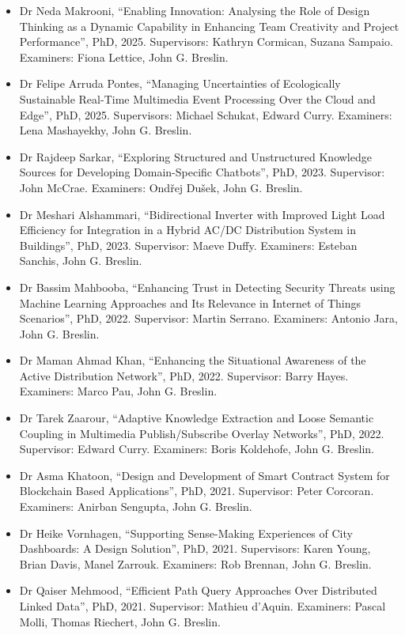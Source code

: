 \documentclass[10pt,a4paper]{res} %
\begin{document}
\begin{resume}
\begin{itemize} \itemsep -2pt
\item Dr Neda Makrooni, ``Enabling Innovation: Analysing the Role of Design Thinking as a Dynamic Capability in Enhancing Team Creativity and Project Performance'', PhD, 2025. Supervisors: Kathryn Cormican, Suzana Sampaio. Examiners: Fiona Lettice, John G. Breslin. %
\item Dr Felipe Arruda Pontes, ``Managing Uncertainties of Ecologically Sustainable Real-Time Multimedia Event Processing Over the Cloud and Edge'', PhD, 2025. Supervisors: Michael Schukat, Edward Curry. Examiners: Lena Mashayekhy, John G. Breslin. %
\item Dr Rajdeep Sarkar, ``Exploring Structured and Unstructured Knowledge Sources for Developing Domain-Specific Chatbots'', PhD, 2023. Supervisor: John McCrae. Examiners: Ond\v{r}ej Du\v{s}ek, John G. Breslin. %
\item Dr Meshari Alshammari, ``Bidirectional Inverter with Improved Light Load Efficiency for Integration in a Hybrid AC/DC Distribution System in Buildings'', PhD, 2023. Supervisor: Maeve Duffy. Examiners: Esteban Sanchis, John G. Breslin. %
\item Dr Bassim Mahbooba, ``Enhancing Trust in Detecting Security Threats using Machine Learning Approaches and Its Relevance in Internet of Things Scenarios'', PhD, 2022. Supervisor: Martin Serrano. Examiners: Antonio Jara, John G. Breslin. %
\item Dr Maman Ahmad Khan, ``Enhancing the Situational Awareness of the Active Distribution Network'', PhD, 2022. Supervisor: Barry Hayes. Examiners: Marco Pau, John G. Breslin. %
\item Dr Tarek Zaarour, ``Adaptive Knowledge Extraction and Loose Semantic Coupling in Multimedia Publish/Subscribe Overlay Networks'', PhD, 2022. Supervisor: Edward Curry. Examiners: Boris Koldehofe, John G. Breslin. %
\item Dr Asma Khatoon, ``Design and Development of Smart Contract System for Blockchain Based Applications'', PhD, 2021. Supervisor: Peter Corcoran. Examiners: Anirban Sengupta, John G. Breslin. %
\item Dr Heike Vornhagen, ``Supporting Sense-Making Experiences of City Dashboards: A Design Solution'', PhD, 2021. Supervisors: Karen Young, Brian Davis, Manel Zarrouk. Examiners: Rob Brennan, John G. Breslin. %
\item Dr Qaiser Mehmood, ``Efficient Path Query Approaches Over Distributed Linked Data'', PhD, 2021. Supervisor: Mathieu d'Aquin. Examiners: Pascal Molli, Thomas Riechert, John G. Breslin.

\end{itemize}
\end{resume}
\end{document}
